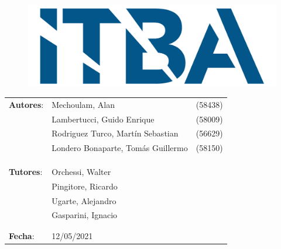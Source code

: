 \begin{titlepage}
\begin{figure}[H]
	\centering
	\includegraphics[width=0.5\linewidth]{./Utils/ITBA_2}
\end{figure}

\vspace*{1.5cm}

\center
{  }

\vspace*{1cm}

{ \textcolor{PName}{} }

\vspace*{3cm}

\begin{tabular}{llr} 	
\textbf{Autores}: & Mechoulam, Alan  &  (58438)\\
 & Lambertucci, Guido Enrique  & (58009) \\
 & Rodriguez Turco, Martín Sebastian  & (56629) \\
 & Londero Bonaparte, Tomás Guillermo  & (58150) \\
 &  & \\
 &  & \\
 &  & \\
\textbf{Tutores}: & Orchessi, Walter & \hspace*{4cm} \\
 & Pingitore, Ricardo & \hspace*{4cm} \\
 & Ugarte, Alejandro & \hspace*{4cm} \\
 & Gasparini, Ignacio & \hspace*{4cm} \\
 &  & \\
 &  & \\
\textbf{Fecha}: & 12/05/2021 & \hspace*{4.5cm}\\
\end{tabular}

\end{titlepage}